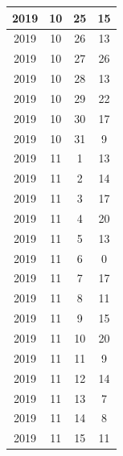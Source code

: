 \begin{longtable} {|c|c|c|c|}
\hline
2019         & 10           & 25           & 15                        \\ 
\hline
2019         & 10           & 26           & 13                        \\ 
\hline
2019         & 10           & 27           & 26                        \\ 
\hline
2019         & 10           & 28           & 13                        \\ 
\hline
2019         & 10           & 29           & 22                        \\ 
\hline
2019         & 10           & 30           & 17                        \\ 
\hline
2019         & 10           & 31           & 9                         \\ 
\hline
2019         & 11           & 1            & 13                        \\ 
\hline
2019         & 11           & 2            & 14                        \\ 
\hline
2019         & 11           & 3            & 17                        \\ 
\hline
2019         & 11           & 4            & 20                        \\ 
\hline
2019         & 11           & 5            & 13                        \\ 
\hline
2019         & 11           & 6            & 0                         \\ 
\hline
2019         & 11           & 7            & 17                        \\ 
\hline
2019         & 11           & 8            & 11                        \\ 
\hline
2019         & 11           & 9            & 15                        \\ 
\hline
2019         & 11           & 10           & 20                        \\ 
\hline
2019         & 11           & 11           & 9                         \\ 
\hline
2019         & 11           & 12           & 14                        \\ 
\hline
2019         & 11           & 13           & 7                         \\ 
\hline
2019         & 11           & 14           & 8                         \\ 
\hline
2019         & 11           & 15           & 11                        \\ 

\end{longtable}
